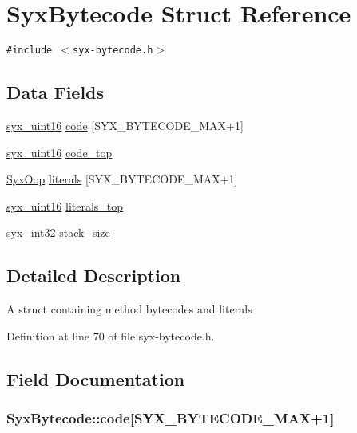 \hypertarget{struct_syx_bytecode}{
\section{SyxBytecode Struct Reference}
\label{struct_syx_bytecode}
}
{\tt \#include $<$syx-bytecode.h$>$}

\subsection*{Data Fields}
\begin{CompactItemize}
\item 
\hyperlink{syx-types_8h_5c0caeeeb45b4575061ab7f368f10337}{syx\_\-uint16} \hyperlink{struct_syx_bytecode_412d52c66bcd286f5a2b1b8b9bb97744}{code} \mbox{[}SYX\_\-BYTECODE\_\-MAX+1\mbox{]}
\item 
\hyperlink{syx-types_8h_5c0caeeeb45b4575061ab7f368f10337}{syx\_\-uint16} \hyperlink{struct_syx_bytecode_0a67bb938887bf5878891840d70549dc}{code\_\-top}
\item 
\hyperlink{syx-types_8h_1121caba2d40b2ce090b640762744ccd}{SyxOop} \hyperlink{struct_syx_bytecode_116da03eb46630df968a72cd96c944ba}{literals} \mbox{[}SYX\_\-BYTECODE\_\-MAX+1\mbox{]}
\item 
\hyperlink{syx-types_8h_5c0caeeeb45b4575061ab7f368f10337}{syx\_\-uint16} \hyperlink{struct_syx_bytecode_8abab30c958b6ff43f846bbcddb31c33}{literals\_\-top}
\item 
\hyperlink{syx-types_8h_9f31c17555a2dfcf25da84b5c4a2e55b}{syx\_\-int32} \hyperlink{struct_syx_bytecode_b09840b5e68800427b584f3f75a754e5}{stack\_\-size}
\end{CompactItemize}


\subsection{Detailed Description}
A struct containing method bytecodes and literals 

Definition at line 70 of file syx-bytecode.h.

\subsection{Field Documentation}
\hypertarget{struct_syx_bytecode_412d52c66bcd286f5a2b1b8b9bb97744}{
\subsubsection{ {\bf SyxBytecode::code}\mbox{[}SYX\_\-BYTECODE\_\-MAX+1\mbox{]}}}
\label{struct_syx_bytecode_412d52c66bcd286f5a2b1b8b9bb97744}


